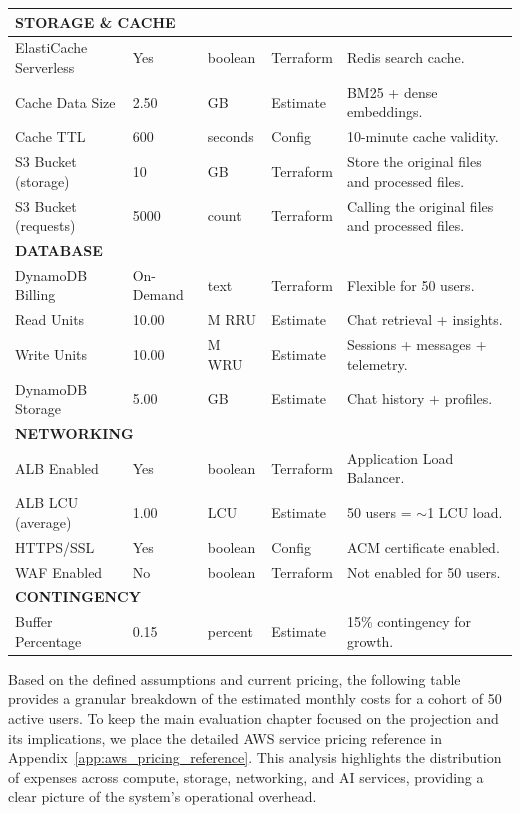 \begin{table}[H]
{\begin{tabular}{lp{2.5cm}llp{8cm}}
        \midrule
        \multicolumn{5}{l}{\textbf{STORAGE \& CACHE}} \\
        \midrule
        ElastiCache Serverless & Yes & boolean & Terraform & Redis search cache. \\
        Cache Data Size & 2.50 & GB & Estimate & BM25 + dense embeddings. \\
        Cache TTL & 600 & seconds & Config & 10-minute cache validity. \\
        S3 Bucket (storage) & 10 & GB & Terraform & Store the original files and processed files. \\
        S3 Bucket (requests) & 5000 & count & Terraform & Calling the original files and processed files. \\
        \midrule
        \multicolumn{5}{l}{\textbf{DATABASE}} \\
        \midrule
        DynamoDB Billing & On-Demand & text & Terraform & Flexible for 50 users. \\
        Read Units & 10.00 & M RRU & Estimate & Chat retrieval + insights. \\
        Write Units & 10.00 & M WRU & Estimate & Sessions + messages + telemetry. \\
        DynamoDB Storage & 5.00 & GB & Estimate & Chat history + profiles. \\
        \midrule
        \multicolumn{5}{l}{\textbf{NETWORKING}} \\
        \midrule
        ALB Enabled & Yes & boolean & Terraform & Application Load Balancer. \\
        ALB LCU (average) & 1.00 & LCU & Estimate & 50 users = $\sim$1 LCU load. \\
        HTTPS/SSL & Yes & boolean & Config & ACM certificate enabled. \\
        WAF Enabled & No & boolean & Terraform & Not enabled for 50 users. \\
        \midrule
        \multicolumn{5}{l}{\textbf{CONTINGENCY}} \\
        \midrule
        Buffer Percentage & 0.15 & percent & Estimate & 15\% contingency for growth. \\
        \bottomrule
    \end{tabular}
    }
\end{table}

\newpage

Based on the defined assumptions and current pricing, the following table provides a granular breakdown of the estimated monthly costs for a cohort of 50 active users. To keep the main evaluation chapter focused on the projection and its implications, we place the detailed AWS service pricing reference in Appendix~\ref{app:aws_pricing_reference}. This analysis highlights the distribution of expenses across compute, storage, networking, and AI services, providing a clear picture of the system's operational overhead.

